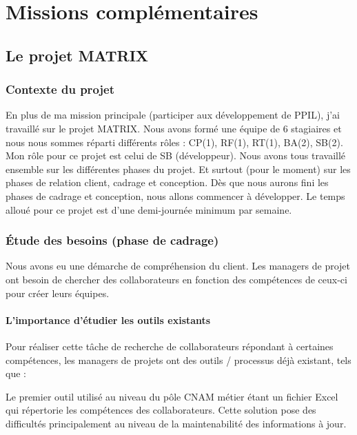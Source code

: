\chapter{Missions complémentaires}
\label{chap:troisiemechapitre}

\section{Le projet MATRIX}

\subsection{Contexte du projet}

En plus de ma mission principale (participer aux développement de PPIL), j'ai travaillé sur le projet MATRIX. Nous avons formé une équipe de 6 stagiaires et nous nous sommes réparti différents rôles : CP(1), RF(1), RT(1), BA(2), SB(2). Mon rôle pour ce projet est celui de SB (développeur). Nous avons tous travaillé ensemble sur les différentes phases du projet. Et surtout (pour le moment) sur les phases de relation client, cadrage et conception. Dès que nous aurons fini les phases de cadrage et conception, nous allons commencer à développer. Le temps alloué pour ce projet est d'une demi-journée minimum par semaine.
 
\subsection{Étude des besoins (phase de cadrage)}

Nous avons eu une démarche de compréhension du client. Les managers de projet ont besoin de chercher des collaborateurs en fonction des compétences de ceux-ci pour créer leurs équipes.

\subsubsection{L'importance d'étudier les outils existants}

Pour réaliser cette tâche de recherche de collaborateurs répondant à certaines compétences, les managers de projets ont des outils / processus déjà existant, tels que :

Le premier outil utilisé au niveau du pôle CNAM métier étant un fichier Excel qui répertorie les compétences des collaborateurs. Cette solution pose des difficultés principalement au niveau de la maintenabilité des informations à jour.

